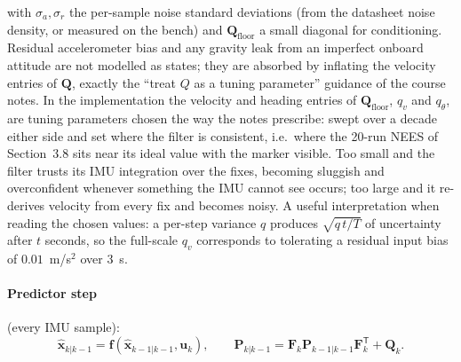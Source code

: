 \documentclass[11pt,a4paper]{article}
\newcommand{\vect}[1]{\bm{#1}}
\newcommand{\mat}[1]{\bm{#1}}
\newcommand{\T}{^{\mathsf{T}}}
\newcommand{\hx}{\hat{\vect{x}}}
\begin{document}
with $\sigma_a,\sigma_r$ the per-sample noise standard deviations (from the datasheet noise density, or measured on the bench) and $\mat Q_{\mathrm{floor}}$ a small diagonal for conditioning. Residual accelerometer bias and any gravity leak from an imperfect onboard attitude are not modelled as states; they are absorbed by inflating the velocity entries of $\mat Q$, exactly the ``treat $Q$ as a tuning parameter'' guidance of the course notes. In the implementation the velocity and heading entries of $\mat Q_{\mathrm{floor}}$, $q_v$ and $q_\theta$, are tuning parameters chosen the way the notes prescribe: swept over a decade either side and set where the filter is consistent, i.e.\ where the 20-run NEES of Section~3.8 sits near its ideal value with the marker visible. Too small and the filter trusts its IMU integration over the fixes, becoming sluggish and overconfident whenever something the IMU cannot see occurs; too large and it re-derives velocity from every fix and becomes noisy. A useful interpretation when reading the chosen values: a per-step variance $q$ produces $\sqrt{q\,t/T}$ of uncertainty after $t$ seconds, so the full-scale $q_v$ corresponds to tolerating a residual input bias of $0.01$~m/s$^2$ over $3$~s.

\paragraph{Predictor step} (every IMU sample):
\begin{equation}
\hx_{k|k-1} = \vect f(\hx_{k-1|k-1},\vect u_k),\qquad
\mat P_{k|k-1} = \mat F_k\mat P_{k-1|k-1}\mat F_k\T + \mat Q_k.
\end{equation}
\end{document}
